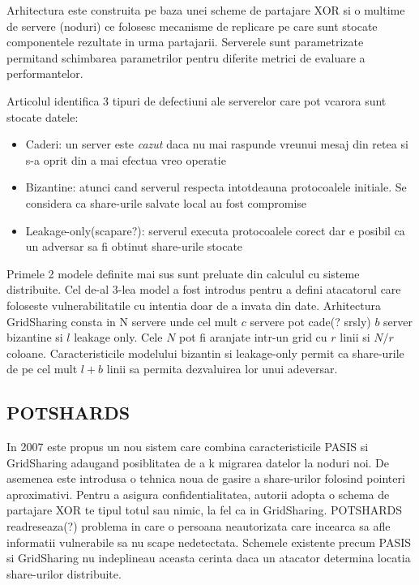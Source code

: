 \documentclass{llncs}
\begin{document}
Arhitectura este construita pe baza unei scheme de partajare XOR si o multime de servere (noduri) ce folosesc mecanisme de replicare pe care sunt stocate componentele rezultate in urma partajarii. Serverele sunt parametrizate permitand schimbarea parametrilor pentru diferite metrici de evaluare a performantelor. \cite{SB:2005}

Articolul identifica 3 tipuri de defectiuni ale serverelor care pot vcarora sunt stocate datele:
\begin{itemize}
	\item Caderi: un server este \textit{cazut} daca nu mai raspunde vreunui mesaj din retea si s-a oprit din a mai efectua vreo operatie 
	\item Bizantine: atunci cand serverul respecta intotdeauna protocoalele initiale. Se considera ca share-urile salvate local au fost compromise
	\item Leakage-only(scapare?): serverul executa protocoalele corect dar e posibil ca un adversar sa fi obtinut share-urile stocate
\end{itemize}
Primele 2 modele definite mai sus sunt preluate din calculul cu sisteme distribuite. Cel de-al 3-lea model a fost introdus pentru a defini atacatorul care foloseste vulnerabilitatile cu intentia doar de a invata din date. Arhitectura GridSharing consta in N servere unde cel mult $c$ servere pot cade(? srsly) $b$ server bizantine si $l$ leakage only. Cele $N$ pot fi aranjate intr-un grid cu $r$ linii si $N/r$ coloane. Caracteristicile modelului bizantin si leakage-only permit ca share-urile de pe cel mult $l + b$ linii sa permita dezvaluirea lor unui adeversar.  

\subsection{POTSHARDS} 
\label{sec:desc_potshards}
In 2007 este propus un nou sistem care combina caracteristicile PASIS si GridSharing adaugand posiblitatea de a k migrarea datelor la noduri noi.
De asemenea este introdusa o tehnica noua de gasire a share-urilor folosind pointeri aproximativi. Pentru a asigura confidentialitatea, autorii adopta o schema de partajare XOR te tipul totul sau nimic, la fel ca in GridSharing.
POTSHARDS readreseaza(?) problema in care o persoana neautorizata care incearca sa afle informatii vulnerabile sa nu scape nedetectata. Schemele existente precum PASIS si GridSharing nu indeplineau aceasta cerinta daca un atacator determina locatia share-urilor distribuite.
\end{document}
